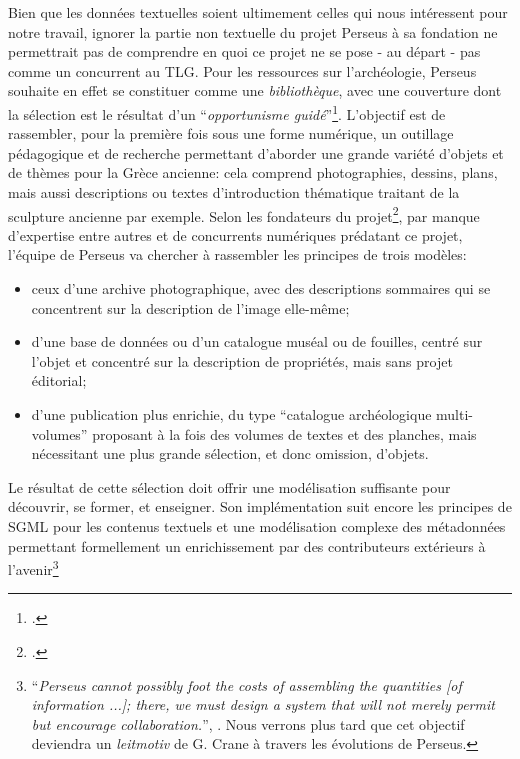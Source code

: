 Bien que les données textuelles soient ultimement celles qui nous intéressent pour notre travail, ignorer la partie non textuelle du projet Perseus à sa fondation ne permettrait pas de comprendre en quoi ce projet ne se pose - au départ - pas comme un concurrent au TLG. Pour les ressources sur l'archéologie, Perseus souhaite en effet se constituer comme une \textit{bibliothèque}, avec une couverture dont la sélection est le résultat d'un \enquote{\textit{opportunisme guidé}}\footcite[p. 145]{mylonas_perseus_1993}. L'objectif est de rassembler, pour la première fois sous une forme numérique, un outillage pédagogique et de recherche permettant d'aborder une grande variété d'objets et de thèmes pour la Grèce ancienne: cela comprend photographies, dessins, plans, mais aussi descriptions ou textes d'introduction thématique traitant de la sculpture ancienne par exemple. Selon les fondateurs du projet\footcite[p. 143]{mylonas_perseus_1993}, par manque d'expertise entre autres et de concurrents numériques prédatant ce projet, l'équipe de Perseus va chercher à rassembler les principes de trois modèles:
\begin{itemize}
    \item ceux d'une archive photographique, avec des descriptions sommaires qui se concentrent sur la description de l'image elle-même;
    \item d'une base de données ou d'un catalogue muséal ou de fouilles, centré sur l'objet et concentré sur la description de propriétés, mais sans projet éditorial;
    \item d'une publication plus enrichie, du type \enquote{catalogue archéologique multi-volumes}  proposant à la fois des volumes de textes et des planches, mais nécessitant une plus grande sélection, et donc omission, d'objets.
\end{itemize}
Le résultat de cette sélection doit offrir une modélisation suffisante pour découvrir, se former, et enseigner. Son implémentation suit encore les principes de SGML pour les contenus textuels et une modélisation complexe des métadonnées permettant formellement un enrichissement par des contributeurs extérieurs à l'avenir\footnote{\enquote{\textit{Perseus cannot possibly foot the costs of assembling the quantities {[of information ...]}; there, we must design a system that will not merely permit but encourage collaboration.}}, \cite[p. 148]{mylonas_perseus_1993}. Nous verrons plus tard que cet objectif deviendra un \textit{leitmotiv} de G. Crane à travers les évolutions de Perseus.}

